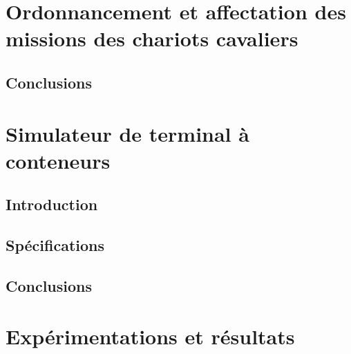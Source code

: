 \documentclass[
a4paper,
11pt,
twoside,
onecolumn,
openright,      %
leqno,          %
final   %
]{phdlasl}
\begin{document}
	\chapter{Ordonnancement et affectation des missions des chariots cavaliers}\label{chapitre:ordo}
	
	\section*{Conclusions}\label{partie:ordo-conclusions}
	

	\chapter{Simulateur de terminal à conteneurs}\label{chapitre:simulation}

	\section*{Introduction}\label{partie:simulation-introduction}
	

	\section{Spécifications}\label{partie:simulation-specification}
	

	

	\section*{Conclusions}\label{partie:simulation-conclusions}
	

	\chapter{Expérimentations et résultats}\label{chapitre:resultats}
\end{document}
